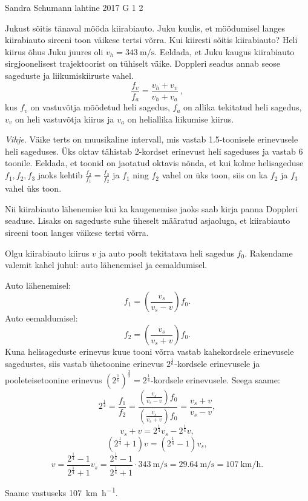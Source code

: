 {Sandra Schumann} %
{lahtine} %
{2017} %
{G 1} %
{2} %
{
\ifStatement
Jukust sõitis tänaval mööda kiirabiauto. Juku kuulis, et möödumisel langes kiirabiauto sireeni toon väikese tertsi võrra. Kui kiiresti sõitis kiirabiauto? Heli kiirus õhus Juku juures oli $v_h = \SI{343}{\meter\per\second}$. Eeldada, et Juku kaugus kiirabiauto sirgjoonelisest trajektoorist on tühiselt väike. Doppleri seadus annab seose sageduste ja liikumiskiiruste vahel.
\[ \frac{f_v}{f_a} = \frac{v_h + v_v}{v_h + v_a} \ , \]
kus \(f_v\) on vastuvõtja mõõdetud heli sagedus, \(f_a\) on allika tekitatud heli sagedus, \(v_v\) on heli vastuvõtja kiirus ja \(v_a\) on heliallika liikumise kiirus.

\emph{Vihje}. Väike terts on muusikaline intervall, mis vastab \num{1.5}-toonisele erinevusele heli sageduses. Üks oktav tähistab 2-kordset erinevust heli sageduses ja vastab 6 toonile. Eeldada, et toonid on jaotatud oktavis nõnda, et kui kolme helisageduse $f_1, f_2, f_3$ jaoks kehtib $\frac{f_2}{f_1} = \frac{f_3}{f_2}$ ja $f_1$ ning $f_2$ vahel on üks toon, siis on ka $f_2$ ja $f_3$ vahel üks toon.
\fi


\ifHint
Nii kiirabiauto lähenemise kui ka kaugenemise jaoks saab kirja panna Doppleri seaduse. Lisaks on sageduste suhe üheselt määratud asjaoluga, et kiirabiauto sireeni toon langes väikese tertsi võrra.
\fi


\ifSolution
Olgu kiirabiauto kiirus $v$ ja auto poolt tekitatava heli sagedus $f_0$. Rakendame valemit kahel juhul: auto lähenemisel ja eemaldumisel.

Auto lähenemisel:
\[f_1 = \left(\frac{v_s}{v_s - v}\right)f_0.\]
Auto eemaldumisel:
\[f_2 = \left(\frac{v_s}{v_s + v}\right)f_0.\]
Kuna helisageduste erinevus kuue tooni võrra vastab kahekordsele erinevusele sagedustes, siis vastab ühetoonine erinevus $2^{\frac 1 6}$-kordsele erinevusele ja pooleteisetoonine erinevus $\left(2^{\frac 1 6}\right)^{\frac 3 2} = 2^{\frac 1 4}$-kordsele erinevusele. Seega saame:
\[2^{\frac 1 4} = \frac{f_1}{f_2} = \frac{(\frac{v_s}{v_s - v})f_0}{(\frac{v_s}{v_s + v})f_0} = \frac{v_s + v}{v_s - v},\]
\[v_s + v = 2^{\frac 1 4}v_s - 2^{\frac 1 4}v,\]
\[(2^{\frac 1 4} + 1)v = (2^{\frac 1 4} - 1)v_s,\]
\[v = \frac{2^{\frac 1 4} - 1}{2^{\frac 1 4} + 1}v_s = \frac{2^{\frac 1 4} - 1}{2^{\frac 1 4} + 1} \cdot \SI{343}{\meter\per\second} = \SI{29.64}{\meter\per\second} = \SI{107}{\kilo\meter\per\hour}. \]

Saame vastuseks \SI{107}{\kilo\meter\per\hour}.
\fi


}
